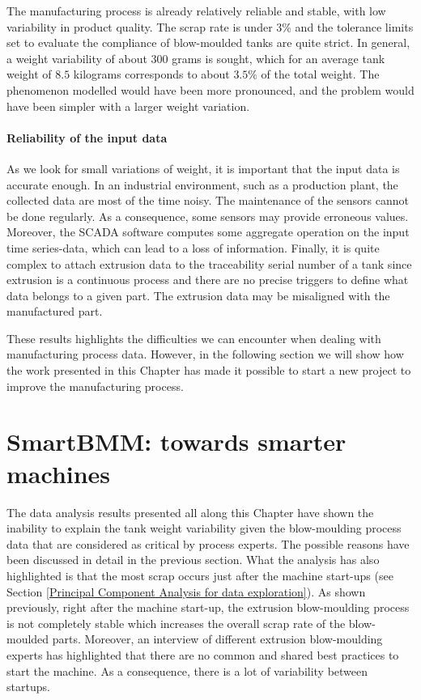 The manufacturing process is already relatively reliable and stable, with low variability in product quality. The scrap rate is under 3\% and the tolerance limits set to evaluate the compliance of blow-moulded tanks are quite strict. In general, a weight variability of about 300 grams is sought, which for an average tank weight of $8.5$ kilograms corresponds to about $3.5\%$ of the total weight. The phenomenon modelled would have been more pronounced, and the problem would have been simpler with a larger weight variation.     

\paragraph{Reliability of the input data}

As we look for small variations of weight, it is important that the input data is accurate enough. In an industrial environment, such as a production plant, the collected data are most of the time noisy. The maintenance of the sensors cannot be done regularly. As a consequence, some sensors may provide erroneous values. Moreover, the SCADA software computes some aggregate operation on the input time series-data, which can lead to a loss of information. Finally, it is quite complex to attach extrusion data to the traceability serial number of a tank since extrusion is a continuous process and there are no precise triggers to define what data belongs to a given part. The extrusion data may be misaligned with the manufactured part.  

These results highlights the difficulties we can encounter when dealing with manufacturing process data. However, in the following section we will show how the work presented in this Chapter has made it possible to start a new project to improve the manufacturing process. 

\section{SmartBMM: towards smarter machines}

The data analysis results presented all along this Chapter have shown the inability to explain the tank weight variability given the blow-moulding process data that are considered as critical by process experts. The possible reasons have been discussed in detail in the previous section. What the analysis has also highlighted is that the most scrap occurs just after the machine start-ups (see Section \ref{Principal Component Analysis for data exploration}). As shown previously, right after the machine start-up, the extrusion blow-moulding process is not completely stable which increases the overall scrap rate of the blow-moulded parts. Moreover, an interview of different extrusion blow-moulding experts has highlighted that there are no common and shared best practices to start the machine. As a consequence,  there is a lot of variability between startups.

